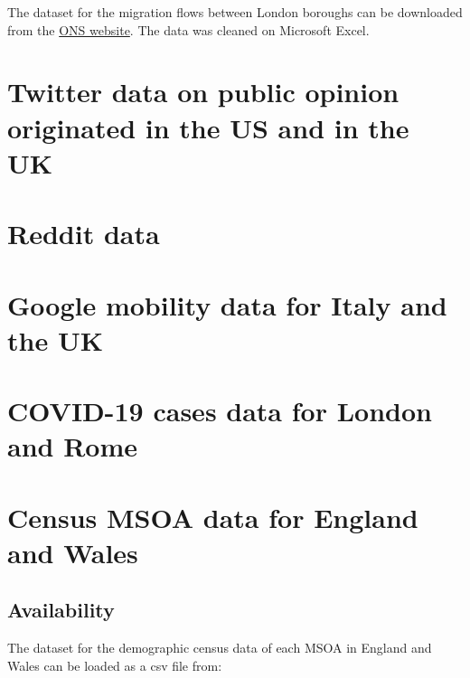 \documentclass[
  letterpaper,
  DIV=11,
  numbers=noendperiod]{scrreprt}
\begin{document}
The dataset for the migration flows between London boroughs can be
downloaded from the
\href{https://www.ons.gov.uk/peoplepopulationandcommunity/populationandmigration/migrationwithintheuk/datasets/internalmigrationbyoriginanddestinationlocalauthoritiessexandsingleyearofagedetailedestimatesdataset}{ONS
website}. The data was cleaned on Microsoft Excel.

\hypertarget{twitter-data-on-public-opinion-originated-in-the-us-and-in-the-uk}{%
\section{Twitter data on public opinion originated in the US and in the
UK}\label{twitter-data-on-public-opinion-originated-in-the-us-and-in-the-uk}}

\hypertarget{reddit-data}{%
\section{Reddit data}\label{reddit-data}}

\hypertarget{google-mobility-data-for-italy-and-the-uk}{%
\section{Google mobility data for Italy and the
UK}\label{google-mobility-data-for-italy-and-the-uk}}

\hypertarget{covid-19-cases-data-for-london-and-rome}{%
\section{COVID-19 cases data for London and
Rome}\label{covid-19-cases-data-for-london-and-rome}}

\hypertarget{census-msoa-data-for-england-and-wales}{%
\section{Census MSOA data for England and
Wales}\label{census-msoa-data-for-england-and-wales}}

\hypertarget{availability-3}{%
\subsection*{Availability}\label{availability-3}}

The dataset for the demographic census data of each MSOA in England and
Wales can be loaded as a csv file from:
\end{document}
